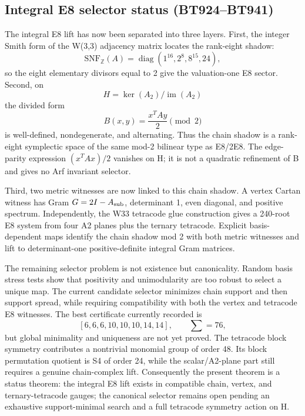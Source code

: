 
\subsection{Integral E8 selector status (BT924--BT941)}\label{subsec:bt942-e8-selector}

The integral E8 lift has now been separated into three layers.  First, the
integer Smith form of the W(3,3) adjacency matrix locates the rank-eight shadow:
\[
  \mathrm{SNF}_{\mathbb Z}(A)=\operatorname{diag}(1^{16},2^8,8^{15},24),
\]
so the eight elementary divisors equal to 2 give the valuation-one E8 sector.
Second, on
\[
  H=\ker(A_2)/\operatorname{im}(A_2)
\]
the divided form
\[
  B(x,y)=\frac{x^T A y}{2}\pmod 2
\]
is well-defined, nondegenerate, and alternating.  Thus the chain shadow is a
rank-eight symplectic space of the same mod-2 bilinear type as E8/2E8.  The
edge-parity expression \((x^T A x)/2\) vanishes on H; it is not a quadratic
refinement of B and gives no Arf invariant selector.

Third, two metric witnesses are now linked to this chain shadow.  A vertex
Cartan witness has Gram \(G=2I-A_{\rm sub}\), determinant 1, even diagonal, and
positive spectrum.  Independently, the W33 tetracode glue construction gives a
240-root E8 system from four A2 planes plus the ternary tetracode.  Explicit
basis-dependent maps identify the chain shadow mod 2 with both metric witnesses
and lift to determinant-one positive-definite integral Gram matrices.

The remaining selector problem is not existence but canonicality.  Random basis
stress tests show that positivity and unimodularity are too robust to select a
unique map.  The current candidate selector minimizes chain support and then
support spread, while requiring compatibility with both the vertex and tetracode
E8 witnesses.  The best certificate currently recorded is
\[
  [6,6,6,10,10,10,14,14],\qquad \sum=76,
\]
but global minimality and uniqueness are not yet proved.  The tetracode block
symmetry contributes a nontrivial monomial group of order 48.  Its block
permutation quotient is S4 of order 24, while the scalar/A2-plane part still
requires a genuine chain-complex lift.  Consequently the present theorem is a
status theorem: the integral E8 lift exists in compatible chain, vertex, and
ternary-tetracode gauges; the canonical selector remains open pending an
exhaustive support-minimal search and a full tetracode symmetry action on H.
